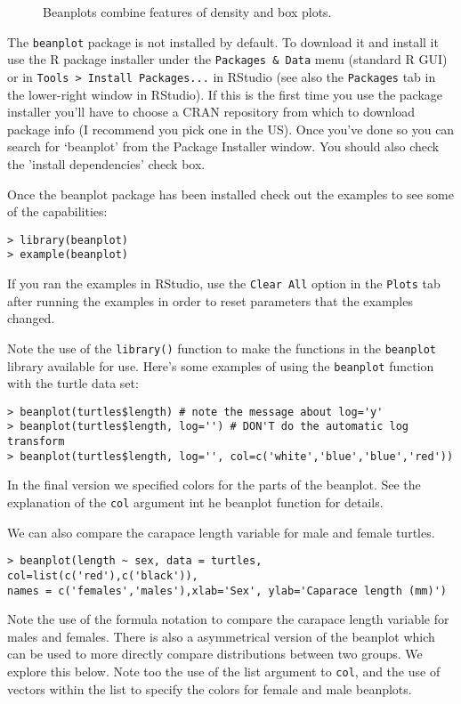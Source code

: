\begin{figure}[htbp]
\centering
\caption{Beanplots combine features of density and box plots.}
\end{figure}

The \lstinline!beanplot! package is not installed by default. To
download it and install it use the R package installer under the
\lstinline!Packages & Data! menu (standard R GUI) or in
\lstinline!Tools > Install Packages...! in RStudio (see also the
\lstinline!Packages! tab in the lower-right window in RStudio). If this
is the first time you use the package installer you'll have to choose a
CRAN repository from which to download package info (I recommend you
pick one in the US). Once you've done so you can search for `beanplot'
from the Package Installer window. You should also check the 'install
dependencies' check box.

Once the beanplot package has been installed check out the examples to
see some of the capabilities:

\begin{lstlisting}
> library(beanplot) 
> example(beanplot)    
\end{lstlisting}
If you ran the examples in RStudio, use the \lstinline!Clear All! option
in the \lstinline!Plots! tab after running the examples in order to
reset parameters that the examples changed.

Note the use of the \lstinline!library()! function to make the functions
in the \lstinline!beanplot! library available for use. Here's some
examples of using the \lstinline!beanplot! function with the turtle data
set:

\begin{lstlisting}
> beanplot(turtles$length) # note the message about log='y'
> beanplot(turtles$length, log='') # DON'T do the automatic log transform
> beanplot(turtles$length, log='', col=c('white','blue','blue','red'))
\end{lstlisting}
In the final version we specified colors for the parts of the beanplot.
See the explanation of the \lstinline!col! argument int he beanplot
function for details.

We can also compare the carapace length variable for male and female
turtles.

\begin{lstlisting}
> beanplot(length ~ sex, data = turtles, col=list(c('red'),c('black')),
names = c('females','males'),xlab='Sex', ylab='Caparace length (mm)')
\end{lstlisting}
Note the use of the formula notation to compare the carapace length
variable for males and females. There is also a asymmetrical version of
the beanplot which can be used to more directly compare distributions
between two groups. We explore this below. Note too the use of the list
argument to \lstinline!col!, and the use of vectors within the list to
specify the colors for female and male beanplots.

